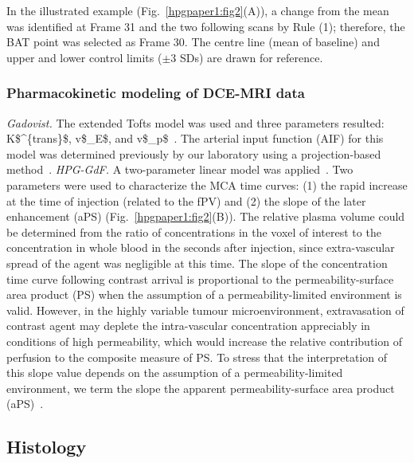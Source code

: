 In the illustrated example (Fig.~\ref{hpgpaper1:fig2}(A)), a change from the mean was identified at Frame 31 and the two following scans by Rule (1); therefore, the \acs{BAT} point was selected as Frame 30.
The centre line (mean of baseline) and upper and lower control limits ($\pm$3 SDs) are drawn for reference.

\subsubsection{Pharmacokinetic modeling of DCE-MRI data}

\textit{Gadovist.} The extended Tofts model was used and three parameters resulted: \acs{K$^{trans}$}, \acs{v$_E$}, and \acs{v$_p$}~\cite{Sourbron:2011ce}.
The arterial input function (AIF) for this model was determined previously by our laboratory using a projection-based method~\cite{Moroz:2013ee}.
\textit{HPG-GdF.} A two-parameter linear model was applied~\cite{Pathak:2005gu}.
Two parameters were used to characterize the \acs{MCA} time curves: (1) the rapid increase at the time of injection (related to the \acs{fPV}) and (2) the slope of the later enhancement (aPS) (Fig.~\ref{hpgpaper1:fig2}(B)).
The relative plasma volume could be determined from the ratio of concentrations in the voxel of interest to the concentration in whole blood in the seconds after injection, since extra-vascular spread of the agent was negligible at this time.
The slope of the concentration time curve following contrast arrival is proportional to the permeability-surface area product (PS) when the assumption of a permeability-limited environment is valid.
However, in the highly variable tumour microenvironment, extravasation of contrast agent may deplete the intra-vascular concentration appreciably in conditions of high permeability, which would increase the relative contribution of perfusion to the composite measure of PS.
To stress that the interpretation of this slope value depends on the assumption of a permeability-limited environment, we term the slope the apparent permeability-surface area product (aPS)~\cite{DaldrupLink:2004gy,Dafni:2002kb}.

\subsection{Histology}

